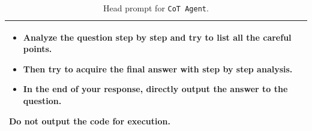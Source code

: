 \begin{table}[h!]
  \caption{Head prompt for \texttt{CoT Agent}.}
  \label{tab:text-output-prompt}
  \centering
  \small %
  \renewcommand{\arraystretch}{1.2} %
  
  \begin{tabularx}{\linewidth}{X} %
    \toprule
    \begin{itemize}[leftmargin=*, topsep=0.5em, itemsep=0.2em]
        \item Analyze the question step by step and try to list all the careful points.
        \item Then try to acquire the final answer with step by step analysis.
        \item In the end of your response, directly output the answer to the question.
    \end{itemize}
    \vspace{0.5em}

    \textbf{Do not output the code for execution.} \\
    \bottomrule
  \end{tabularx}
\end{table}

